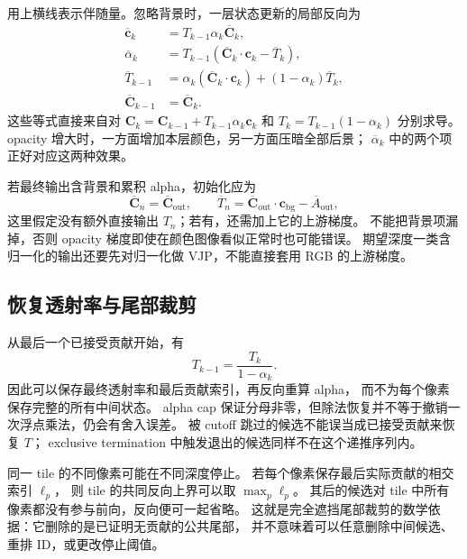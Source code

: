 用上横线表示伴随量。忽略背景时，一层状态更新的局部反向为
\begin{align}
 \overline{\mathbf c}_k
 &=T_{k-1}\alpha_k\overline{\mathbf C}_k,\\
 \overline\alpha_k
 &=T_{k-1}\left(
   \overline{\mathbf C}_k\mathbin{\cdot}\mathbf c_k-\overline T_k\right),\\
 \overline T_{k-1}
 &=\alpha_k\left(\overline{\mathbf C}_k\mathbin{\cdot}\mathbf c_k\right)
 +(1-\alpha_k)\overline T_k,\\
 \overline{\mathbf C}_{k-1}&=\overline{\mathbf C}_k.
\end{align}
这些等式直接来自对 $\mathbf C_k=\mathbf C_{k-1}+T_{k-1}\alpha_k\mathbf c_k$
和 $T_k=T_{k-1}(1-\alpha_k)$ 分别求导。
opacity 增大时，一方面增加本层颜色，另一方面压暗全部后景；
$\overline\alpha_k$ 中的两个项正好对应这两种效果。

若最终输出含背景和累积 alpha，初始化应为
\begin{equation}
 \overline{\mathbf C}_n=\overline{\mathbf C}_{\mathrm{out}},\qquad
 \overline T_n=
 \overline{\mathbf C}_{\mathrm{out}}\mathbin{\cdot}\mathbf c_{\mathrm{bg}}
 -\overline A_{\mathrm{out}},
\end{equation}
这里假定没有额外直接输出 $T_n$；若有，还需加上它的上游梯度。
不能把背景项漏掉，否则 opacity 梯度即使在颜色图像看似正常时也可能错误。
期望深度一类含归一化的输出还要先对归一化做 VJP，不能直接套用 RGB 的上游梯度。

\subsection{恢复透射率与尾部裁剪}

从最后一个已接受贡献开始，有
\begin{equation}
 T_{k-1}=\frac{T_k}{1-\alpha_k}.
\end{equation}
因此可以保存最终透射率和最后贡献索引，再反向重算 alpha，
而不为每个像素保存完整的所有中间状态。
alpha cap 保证分母非零，但除法恢复并不等于撤销一次浮点乘法，仍会有舍入误差。
被 cutoff 跳过的候选不能误当成已接受贡献来恢复 $T$；
exclusive termination 中触发退出的候选同样不在这个递推序列内。

同一 tile 的不同像素可能在不同深度停止。
若每个像素保存最后实际贡献的相交索引 $\ell_p$，
则 tile 的共同反向上界可以取 $\max_p\ell_p$。
其后的候选对 tile 中所有像素都没有参与前向，反向便可一起省略。
这就是完全遮挡尾部裁剪的数学依据：它删除的是已证明无贡献的公共尾部，
并不意味着可以任意删除中间候选、重排 ID，或更改停止阈值。

